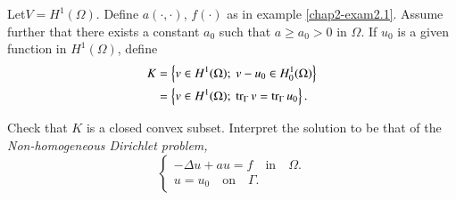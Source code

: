 \begin{exercise}\label{chap2-exer2.2}
Let\pageoriginale $V=H^{1}(\Omega)$. Define $a(\cdot,\cdot)$,
$f(\cdot)$ as in example \ref{chap2-exam2.1}. Assume further that
there exists a constant $a_{0}$ such that $a\geq a_{0}>0$ in
$\Omega$. If $u_{0}$ is a given function in $H^{1}(\Omega)$, define
\begin{align*}
K &= \left\{v\in H^{1}(\Omega);\ v-u_{0}\in
H^{1}_{0}(\Omega)\right\}\\
 &= \left\{v\in
H^{1}(\Omega);\ \operatorname{tr}_{\Gamma}v=\operatorname{tr}_{\Gamma}u_{0}\right\}. 
\end{align*}

Check that $K$ is a closed convex subset. Interpret the solution to be
that of the {\em Non-homogeneous Dirichlet problem,}
\begin{equation*}
\begin{cases}
-\Delta u+au =f\quad\text{in}\quad \Omega.\\
u=u_{0}\quad\text{on}\quad \Gamma.
\end{cases}
\end{equation*}
\end{exercise}

